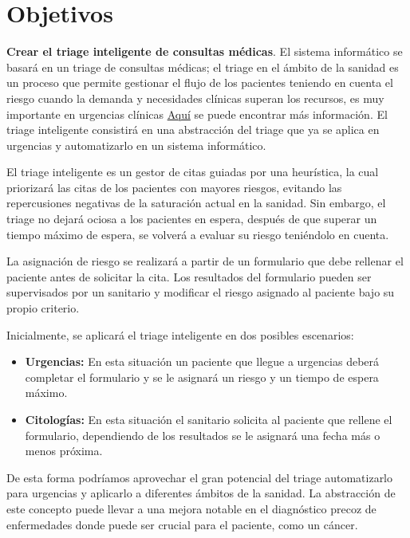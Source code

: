 \section{Objetivos}

\textbf{Crear el triage inteligente de consultas médicas}. El sistema informático se basará en un triage de consultas médicas; el triage en el ámbito
 de la sanidad es un proceso que permite gestionar el flujo de los pacientes teniendo en cuenta el riesgo cuando la demanda y necesidades clínicas
 superan los recursos, es muy importante en urgencias clínicas \href{https://scielo.isciii.es/scielo.php?script=sci_arttext&pid=S1137-66272010000200008}{Aquí}
 se puede encontrar más información. El triage inteligente consistirá en una abstracción del triage que ya se aplica en urgencias y automatizarlo en un sistema informático.

El triage inteligente es un gestor de citas guiadas por una heurística, la cual priorizará las citas de los pacientes
con mayores riesgos, evitando las repercusiones negativas de la saturación actual en la sanidad. Sin embargo, el triage no dejará
ociosa a los pacientes en espera, después de que superar un tiempo máximo de espera, se volverá a evaluar su riesgo teniéndolo en cuenta.

La asignación de riesgo se realizará a partir de un formulario que debe rellenar el paciente antes de solicitar la cita.
Los resultados del formulario pueden ser supervisados por un sanitario y modificar el riesgo asignado al paciente bajo su propio criterio.

Inicialmente, se aplicará el triage inteligente en dos posibles escenarios:
\begin{itemize}
\item \textbf{Urgencias:} En esta situación un paciente que llegue a urgencias deberá completar el formulario y se le asignará un riesgo y un tiempo de espera máximo.
\item \textbf{Citologías:} En esta situación el sanitario solicita al paciente que rellene el formulario, dependiendo de los resultados se le asignará una fecha más o menos próxima.
\end{itemize}

De esta forma podríamos aprovechar el gran potencial del triage automatizarlo para urgencias y aplicarlo a diferentes ámbitos de la sanidad.
La abstracción de este concepto puede llevar a una mejora notable en el diagnóstico precoz de enfermedades donde puede ser crucial para el paciente, como un cáncer.

